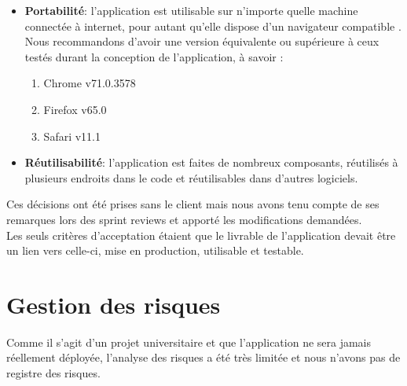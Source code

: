 \documentclass[t, 12pt, usenames,dvipsnames]{article}
\begin{document}
\begin{itemize}
            \item \textbf{Portabilité}: l'application est utilisable sur n'importe quelle machine connectée à internet, pour autant qu'elle dispose d'un navigateur compatible . Nous recommandons d'avoir une version équivalente ou supérieure à ceux testés durant la conception de l'application, à savoir : 
                \begin{enumerate}
                    \item Chrome v71.0.3578
                    \item Firefox v65.0
                    \item Safari v11.1
                \end{enumerate}
            \item \textbf{Réutilisabilité}: l'application est faites de nombreux composants, réutilisés à plusieurs endroits dans le code et réutilisables dans d'autres logiciels.
        \end{itemize}
        
        \noindent Ces décisions ont été prises sans le client mais nous avons tenu compte de ses remarques lors des sprint reviews et apporté les modifications demandées.\\
        Les seuls critères d'acceptation étaient que le livrable de l'application devait être un lien vers celle-ci, mise en production, utilisable et testable.
        
    

    \newpage

    \section{Gestion des risques}
    \noindent Comme il s'agit d'un projet universitaire et que l'application ne sera jamais réellement déployée, l'analyse des risques a été très limitée et nous n'avons pas de registre des risques.
    
\end{document}
